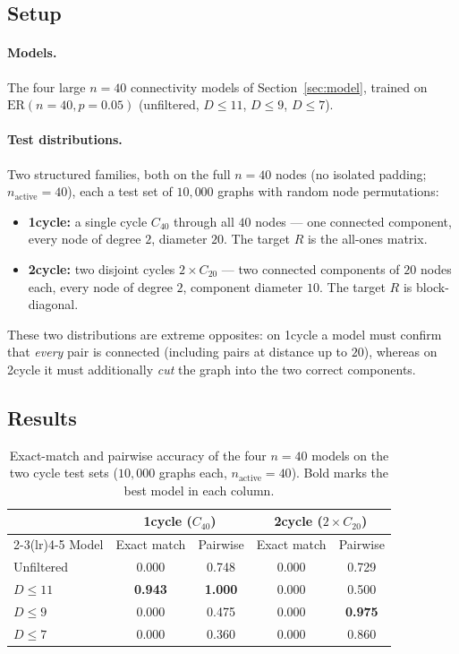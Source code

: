 \documentclass[11pt,a4paper]{article}
\begin{document}
\subsection{Setup}

\paragraph{Models.} The four large $n = 40$ connectivity models of
Section~\ref{sec:model}, trained on $\mathrm{ER}(n = 40, p = 0.05)$
(unfiltered, $D \le 11$, $D \le 9$, $D \le 7$).

\paragraph{Test distributions.} Two structured families, both on the full
$n = 40$ nodes (no isolated padding; $n_{\text{active}} = 40$), each a test set
of $10{,}000$ graphs with random node permutations:
\begin{itemize}
    \item \textbf{1cycle:} a single cycle $C_{40}$ through all $40$ nodes ---
          one connected component, every node of degree $2$, diameter $20$.
          The target $R$ is the all-ones matrix.
    \item \textbf{2cycle:} two disjoint cycles $2 \times C_{20}$ --- two
          connected components of $20$ nodes each, every node of degree $2$,
          component diameter $10$. The target $R$ is block-diagonal.
\end{itemize}
These two distributions are extreme opposites: on 1cycle a model must confirm
that \emph{every} pair is connected (including pairs at distance up to $20$),
whereas on 2cycle it must additionally \emph{cut} the graph into the two
correct components.

\subsection{Results}

\begin{table}[H]
\centering
\begin{tabular}{lcccc}
\toprule
 & \multicolumn{2}{c}{1cycle ($C_{40}$)} & \multicolumn{2}{c}{2cycle ($2\times C_{20}$)} \\
\cmidrule(lr){2-3}\cmidrule(lr){4-5}
Model & Exact match & Pairwise & Exact match & Pairwise \\
\midrule
Unfiltered & 0.000 & 0.748 & 0.000 & 0.729 \\
$D \le 11$ & \textbf{0.943} & \textbf{1.000} & 0.000 & 0.500 \\
$D \le 9$  & 0.000 & 0.475 & 0.000 & \textbf{0.975} \\
$D \le 7$  & 0.000 & 0.360 & 0.000 & 0.860 \\
\bottomrule
\end{tabular}
\caption{Exact-match and pairwise accuracy of the four $n = 40$ models on the
two cycle test sets ($10{,}000$ graphs each, $n_{\text{active}} = 40$). Bold
marks the best model in each column.}
\label{tab:cycles}
\end{table}
\end{document}

